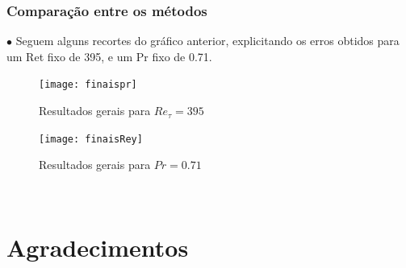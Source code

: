 \documentclass[xcolor=dvipsnames,10pt,aspectratio=169]{beamer}
\begin{document}
		\begin{frame}
		\frametitle{Comparação entre os métodos}
		$\bullet$ Seguem alguns recortes do gráfico anterior, explicitando os erros obtidos para um Ret fixo de 395, e um Pr fixo de 0.71.\\
		\begin{minipage}[h!]{0.47\textwidth}
			\begin{figure}
	\centering
	\texttt{[image: finaispr]}
	\caption{Resultados gerais para $Re_\tau = 395$}
\end{figure}
		\end{minipage}
		\begin{minipage}[h!]{0.47\textwidth}
		\begin{figure}
			\centering
			\texttt{[image: finaisRey]}
			\caption{Resultados gerais para $Pr = 0.71$}
		\end{figure}
		\end{minipage}\\
		\end{frame}
		
	
	
	
	
	
	
	\section{Agradecimentos}
		
		
		
		
		
\end{document}
